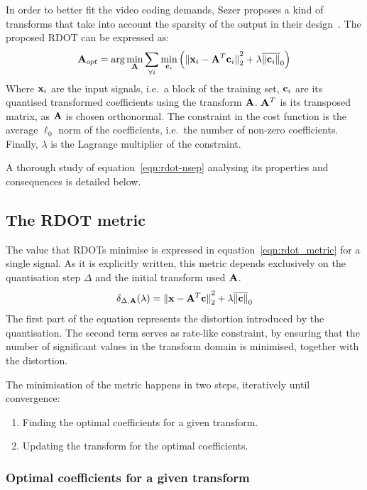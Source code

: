 \documentclass[11pt,a4paper,openright,twoside]{book}
\numberwithin{equation}{section} %
\begin{document}
In order to better fit the video coding demands, Sezer proposes a kind
of transforms that take into account the sparsity of the output in their
design~\cite{sezer-11-phd}.
The proposed \ac{RDOT} can be expressed as:
\begin{equation}
	\mathbf{A}_{opt} = \text{arg}\min\limits_{\mathbf{A}}
	\sum_{\forall i} \min\limits_{\mathbf{c}_i}
	\left(
	{\Vert \mathbf{x}_i - \mathbf{A}^T\mathbf{c}_i \Vert}_2^2 + \lambda\overline{\Vert \mathbf{c}_i \Vert}_0
	\right)
	\label{eqn:rdot-nsep}
\end{equation}
Where $\mathbf{x}_i$ are the input signals, i.e.\ a block of the training set,
$\mathbf{c}_i$ are its quantised transformed coefficients using the transform
$\mathbf{A}$.
$\mathbf{A}^T$ is its transposed matrix, as $\mathbf{A}$ is chosen orthonormal.
The constraint in the cost function is the average $\ell_0$ norm of the
coefficients, i.e.\ the number of non-zero coefficients.
Finally, $\lambda$ is the Lagrange multiplier of the constraint.

A thorough study of equation~\ref{eqn:rdot-nsep} analysing its
properties and consequences is detailed below.

\subsection{The \acs{RDOT} metric}
\label{sub:the_rdot_metric}

The value that \acp{RDOT} minimise is expressed in
equation~\ref{eqn:rdot_metric} for a single signal.
As it is explicitly written, this metric depends exclusively on the
quantisation step $\Delta$ and the initial transform used $\mathbf{A}$.
\begin{equation}
	\delta_{\Delta,\mathbf{A}} (\lambda) =
	{\Vert \mathbf{x} - \mathbf{A}^T \mathbf{c} \Vert}_2^2 + \lambda\overline{\Vert \mathbf{c} \Vert}_0
	\label{eqn:rdot_metric}
\end{equation}
The first part of the equation represents the distortion introduced by
the quantisation.
The second term serves as rate-like constraint, by ensuring that the
number of significant values in the transform domain is minimised,
together with the distortion.

The minimisation of the metric happens in two steps, iteratively until
convergence:
\begin{enumerate}
	\item Finding the optimal coefficients for a given transform.
	\item Updating the transform for the optimal coefficients.
\end{enumerate}

\subsubsection{Optimal coefficients for a given transform}
\label{ssub:optimal_coefficients_for_a_given_transform}
\end{document}
